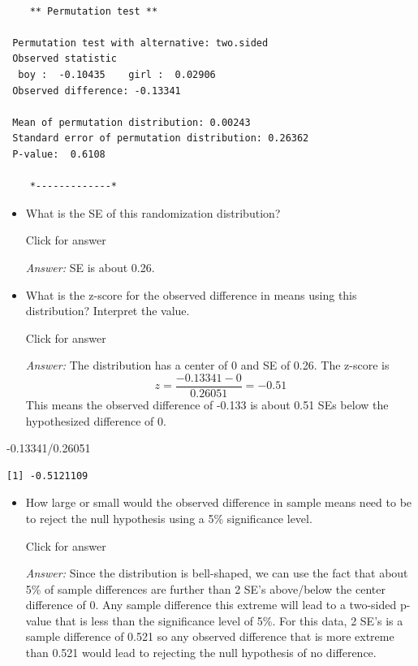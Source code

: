 \documentclass[
]{book}
\newenvironment{Shaded}{\begin{snugshade}}{\end{snugshade}}
\newcommand{\FloatTok}[1]{\textcolor[rgb]{0.00,0.00,0.81}{#1}}
\newcommand{\SpecialCharTok}[1]{\textcolor[rgb]{0.00,0.00,0.00}{#1}}
\providecommand{\tightlist}{%
  \setlength{\itemsep}{0pt}\setlength{\parskip}{0pt}}
\begin{document}
\begin{verbatim}

    ** Permutation test **

 Permutation test with alternative: two.sided 
 Observed statistic
  boy :  -0.10435    girl :  0.02906 
 Observed difference: -0.13341 

 Mean of permutation distribution: 0.00243 
 Standard error of permutation distribution: 0.26362 
 P-value:  0.6108 

    *-------------*
\end{verbatim}

\begin{itemize}
\tightlist
\item
  What is the SE of this randomization distribution?

  Click for answer

  \emph{Answer:} SE is about 0.26.
\end{itemize}

\begin{itemize}
\tightlist
\item
  What is the z-score for the observed difference in means using this distribution? Interpret the value.
  \vspace*{.5in}

  Click for answer

  \emph{Answer:} The distribution has a center of 0 and SE of 0.26. The z-score is
  \[
  z = \dfrac{-0.13341 - 0}{0.26051} = -0.51
  \]
  This means the observed difference of -0.133 is about 0.51 SEs below the hypothesized difference of 0.
\end{itemize}

\begin{Shaded}
\begin{Highlighting}[]
\SpecialCharTok{{-}}\FloatTok{0.13341}\SpecialCharTok{/}\FloatTok{0.26051} 
\end{Highlighting}
\end{Shaded}

\begin{verbatim}
[1] -0.5121109
\end{verbatim}

\begin{itemize}
\tightlist
\item
  How large or small would the observed difference in sample means need to be to reject the null hypothesis using a 5\% significance level.

  Click for answer

  \emph{Answer:} Since the distribution is bell-shaped, we can use the fact that about 5\% of sample differences are further than 2 SE's above/below the center difference of 0. Any sample difference this extreme will lead to a two-sided p-value that is less than the significance level of 5\%. For this data, 2 SE's is a sample difference of 0.521 so any observed difference that is more extreme than 0.521 would lead to rejecting the null hypothesis of no difference.
\end{itemize}
\end{document}
